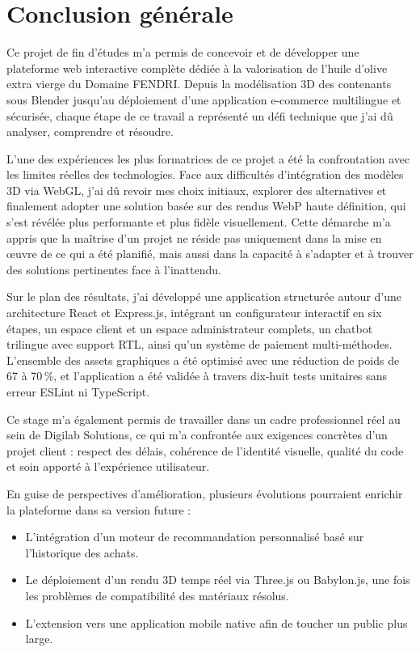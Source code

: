 \chapter*{Conclusion générale}

Ce projet de fin d'études m'a permis de concevoir et de développer une plateforme web interactive complète dédiée à la valorisation de l'huile d'olive extra vierge du Domaine FENDRI. Depuis la modélisation 3D des contenants sous Blender jusqu'au déploiement d'une application e-commerce multilingue et sécurisée, chaque étape de ce travail a représenté un défi technique que j'ai dû analyser, comprendre et résoudre.

L'une des expériences les plus formatrices de ce projet a été la confrontation avec les limites réelles des technologies. Face aux difficultés d'intégration des modèles 3D via WebGL, j'ai dû revoir mes choix initiaux, explorer des alternatives et finalement adopter une solution basée sur des rendus WebP haute définition, qui s'est révélée plus performante et plus fidèle visuellement. Cette démarche m'a appris que la maîtrise d'un projet ne réside pas uniquement dans la mise en œuvre de ce qui a été planifié, mais aussi dans la capacité à s'adapter et à trouver des solutions pertinentes face à l'inattendu.

Sur le plan des résultats, j'ai développé une application structurée autour d'une architecture React et Express.js, intégrant un configurateur interactif en six étapes, un espace client et un espace administrateur complets, un chatbot trilingue avec support RTL, ainsi qu'un système de paiement multi-méthodes. L'ensemble des assets graphiques a été optimisé avec une réduction de poids de 67 à 70\,\%, et l'application a été validée à travers dix-huit tests unitaires sans erreur ESLint ni TypeScript.

Ce stage m'a également permis de travailler dans un cadre professionnel réel au sein de Digilab Solutions, ce qui m'a confrontée aux exigences concrètes d'un projet client : respect des délais, cohérence de l'identité visuelle, qualité du code et soin apporté à l'expérience utilisateur.

En guise de perspectives d'amélioration, plusieurs évolutions pourraient enrichir la plateforme dans sa version future :
\begin{itemize}
  \item L'intégration d'un moteur de recommandation personnalisé basé sur l'historique des achats.
  \item Le déploiement d'un rendu 3D temps réel via Three.js ou Babylon.js, une fois les problèmes de compatibilité des matériaux résolus.
  \item L'extension vers une application mobile native afin de toucher un public plus large.
\end{itemize}

